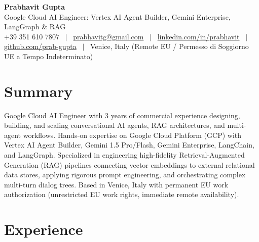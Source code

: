 \documentclass[a4paper,10pt]{article}
\begin{document}
\begin{minipage}[c]{0.80\textwidth}
  {\Huge\bfseries Prabhavit Gupta}\\[3pt]
  {\color{accent}\large Google Cloud AI Engineer: Vertex AI Agent Builder, Gemini Enterprise, LangGraph \& RAG}\\[6pt]
  {\footnotesize +39 351 610 7807 ~$\vert$~
  \href{mailto:prabhavitg@gmail.com}{prabhavitg@gmail.com} ~$\vert$~
  \href{https://www.linkedin.com/in/prabhavit/}{linkedin.com/in/prabhavit} ~$\vert$~
  \href{https://github.com/prab-gupta}{github.com/prab-gupta} ~$\vert$~
  Venice, Italy (Remote EU / Permesso di Soggiorno UE a Tempo Indeterminato)}
\end{minipage}\hfill

\section{Summary}
Google Cloud AI Engineer with 3 years of commercial experience designing, building, and scaling conversational AI agents, RAG architectures, and multi-agent workflows. Hands-on expertise on Google Cloud Platform (GCP) with Vertex AI Agent Builder, Gemini 1.5 Pro/Flash, Gemini Enterprise, LangChain, and LangGraph. Specialized in engineering high-fidelity Retrieval-Augmented Generation (RAG) pipelines connecting vector embeddings to external relational data stores, applying rigorous prompt engineering, and orchestrating complex multi-turn dialog trees. Based in Venice, Italy with permanent EU work authorization (unrestricted EU work rights, immediate remote availability).

\section{Experience}
\end{document}

